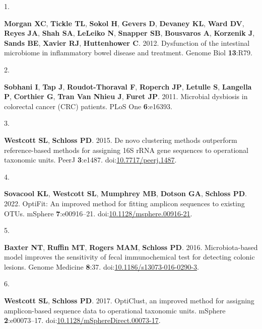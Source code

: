 \documentclass[
]{article}
\newlength{\cslhangindent}
\newlength{\csllabelwidth}
\newlength{\cslentryspacingunit} %
\newenvironment{CSLReferences}[2] %
 {%
  \setlength{\parindent}{0pt}
  \ifodd #1
  \let\oldpar\par
  \def\par{\hangindent=\cslhangindent\oldpar}
  \fi
  \setlength{\parskip}{#2\cslentryspacingunit}
 }%
 {}
\newcommand{\CSLLeftMargin}[1]{\parbox[t]{\csllabelwidth}{#1}}
\newcommand{\CSLRightInline}[1]{\parbox[t]{\linewidth - \csllabelwidth}{#1}\break}
\begin{document}
\hypertarget{refs}{}
\begin{CSLReferences}{0}{1}
\leavevmode{}%
\CSLLeftMargin{1. }%
\CSLRightInline{\textbf{Morgan XC}, \textbf{Tickle TL}, \textbf{Sokol
H}, \textbf{Gevers D}, \textbf{Devaney KL}, \textbf{Ward DV},
\textbf{Reyes JA}, \textbf{Shah SA}, \textbf{LeLeiko N}, \textbf{Snapper
SB}, \textbf{Bousvaros A}, \textbf{Korzenik J}, \textbf{Sands BE},
\textbf{Xavier RJ}, \textbf{Huttenhower C}. 2012. Dysfunction of the
intestinal microbiome in inflammatory bowel disease and treatment.
Genome Biol \textbf{13}:R79.}

\leavevmode{}%
\CSLLeftMargin{2. }%
\CSLRightInline{\textbf{Sobhani I}, \textbf{Tap J},
\textbf{Roudot-Thoraval F}, \textbf{Roperch JP}, \textbf{Letulle S},
\textbf{Langella P}, \textbf{Corthier G}, \textbf{Tran Van Nhieu J},
\textbf{Furet JP}. 2011. Microbial dysbiosis in colorectal cancer
({CRC}) patients. PLoS One \textbf{6}:e16393.}

\leavevmode{}%
\CSLLeftMargin{3. }%
\CSLRightInline{\textbf{Westcott SL}, \textbf{Schloss PD}. 2015. De novo
clustering methods outperform reference-based methods for assigning 16S
rRNA gene sequences to operational taxonomic units. PeerJ
\textbf{3}:e1487.
doi:\href{https://doi.org/10.7717/peerj.1487}{10.7717/peerj.1487}.}

\leavevmode{}%
\CSLLeftMargin{4. }%
\CSLRightInline{\textbf{Sovacool KL}, \textbf{Westcott SL},
\textbf{Mumphrey MB}, \textbf{Dotson GA}, \textbf{Schloss PD}. 2022.
OptiFit: An improved method for fitting amplicon sequences to existing
OTUs. mSphere \textbf{7}:e00916--21.
doi:\href{https://doi.org/10.1128/msphere.00916-21}{10.1128/msphere.00916-21}.}

\leavevmode{}%
\CSLLeftMargin{5. }%
\CSLRightInline{\textbf{Baxter NT}, \textbf{Ruffin MT}, \textbf{Rogers
MAM}, \textbf{Schloss PD}. 2016. Microbiota-based model improves the
sensitivity of fecal immunochemical test for detecting colonic lesions.
Genome Medicine \textbf{8}:37.
doi:\href{https://doi.org/10.1186/s13073-016-0290-3}{10.1186/s13073-016-0290-3}.}

\leavevmode{}%
\CSLLeftMargin{6. }%
\CSLRightInline{\textbf{Westcott SL}, \textbf{Schloss PD}. 2017.
OptiClust, an improved method for assigning amplicon-based sequence data
to operational taxonomic units. mSphere \textbf{2}:e00073--17.
doi:\href{https://doi.org/10.1128/mSphereDirect.00073-17}{10.1128/mSphereDirect.00073-17}.}


\end{CSLReferences}
\end{document}
